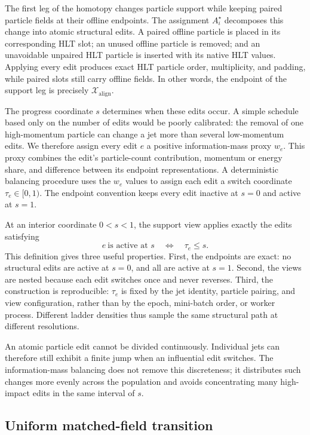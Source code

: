 \documentclass[11pt]{article}
\newcommand{\xalign}{\mathcal{X}_{\mathrm{align}}}
\begin{document}
The first leg of the homotopy changes particle support while keeping paired
particle fields at their offline endpoints.  The assignment $A_i^{\star}$
decomposes this change into atomic structural edits.  A paired offline
particle is placed in its corresponding HLT slot; an unused offline particle
is removed; and an unavoidable unpaired HLT particle is inserted with its
native HLT values.  Applying every edit produces exact HLT particle order,
multiplicity, and padding, while paired slots still carry offline fields.  In
other words, the endpoint of the support leg is precisely $\xalign$.

The progress coordinate $s$ determines when these edits occur.  A simple
schedule based only on the number of edits would be poorly calibrated: the
removal of one high-momentum particle can change a jet more than several
low-momentum edits.  We therefore assign every edit $e$ a positive
information-mass proxy $w_e$.  This proxy combines the edit's particle-count
contribution, momentum or energy share, and difference between its endpoint
representations.  A deterministic balancing procedure uses the $w_e$ values
to assign each edit a switch coordinate $\tau_e\in[0,1)$.  The endpoint
convention keeps every edit inactive at $s=0$ and active at $s=1$.

At an interior coordinate $0<s<1$, the support view applies exactly the edits
satisfying
\begin{equation}
    e\ \text{is active at }s
    \quad\Longleftrightarrow\quad
    \tau_e\leq s.
    \label{eq:structural-switch}
\end{equation}
This definition gives three useful properties.  First, the endpoints are
exact: no structural edits are active at $s=0$, and all are active at $s=1$.
Second, the views are nested because each edit switches once and never
reverses.  Third, the construction is reproducible: $\tau_e$ is fixed by the
jet identity, particle pairing, and view configuration, rather than by the
epoch, mini-batch order, or worker process.  Different ladder densities thus
sample the same structural path at different resolutions.

An atomic particle edit cannot be divided continuously.  Individual jets can
therefore still exhibit a finite jump when an influential edit switches.  The
information-mass balancing does not remove this discreteness; it distributes
such changes more evenly across the population and avoids concentrating many
high-impact edits in the same interval of $s$.

\subsection{Uniform matched-field transition}
\end{document}
